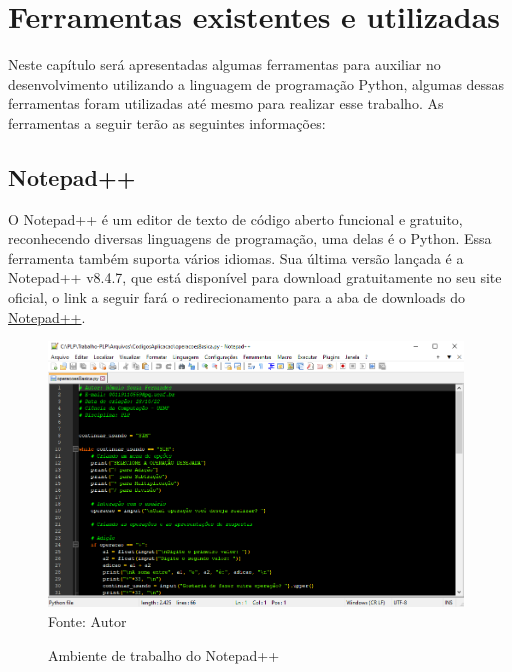 

\chapter{Ferramentas existentes e utilizadas}

Neste capítulo será apresentadas algumas ferramentas para auxiliar no desenvolvimento utilizando a linguagem de programação Python, algumas dessas ferramentas foram utilizadas até mesmo para realizar esse trabalho. As ferramentas a seguir terão as seguintes informações:

    \section{Notepad++}
	O Notepad++ é um editor de texto de código aberto funcional e gratuito, reconhecendo diversas linguagens de programação, uma delas é o Python. Essa ferramenta também suporta vários idiomas. Sua última versão lançada é a Notepad++ v8.4.7, que está disponível para download gratuitamente no seu site oficial, o link a seguir fará o redirecionamento para a aba de downloads do \href{https://notepad-plus-plus.org/downloads/}{Notepad++}. 
	
	\begin{figure}[H]
		\begin{center}
			\caption{Ambiente de trabalho do Notepad++} \label{ling1}
			\includegraphics[width=11cm]{note.PNG} \\
			{\tiny \sf Fonte:{ Autor}}
		\end{center}
	\end{figure}
	
